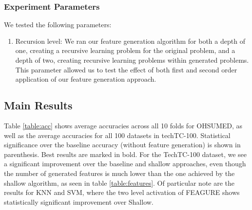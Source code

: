 \documentclass[twoside,11pt]{article}
\theoremstyle{definition}
\begin{document}
\subsubsection{Experiment Parameters}

We tested the following parameters: 
\begin{enumerate}
	\item Recursion level: We ran our feature generation algorithm for both a depth of one, creating a recursive learning problem for the original problem, and a depth of two, creating recursive learning problems within generated problems. This parameter allowed us to test the effect of both first and second order application of our feature generation approach.
\end{enumerate}


\subsection{Main Results}

Table \ref{table:acc} shows average accuracies across all 10 folds for OHSUMED, as well as the average accuracies for all 100 datasets in techTC-100. Statistical significance over the baseline accuracy (without feature generation) is shown in parenthesis. Best results are marked in bold.
For the TechTC-100 dataset, we see a significant improvement over the baseline and shallow approaches, even though the number of generated features is much lower than the one achieved by the shallow algorithm, as seen in table \ref{table:features}.
Of particular note are the results for KNN and SVM, where the two level activation of FEAGURE shows statistically significant improvement over Shallow. 
\end{document}
